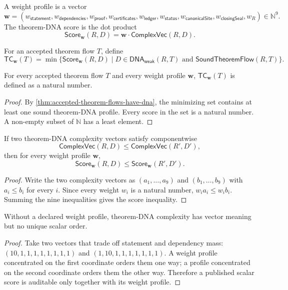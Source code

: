 \begin{definition}
\label{def:theorem-dna-weight-score}
A weight profile is a vector
$$
\mathbf w=
(w_{\mathsf{statement}},w_{\mathsf{dependencies}},w_{\mathsf{proof}},
w_{\mathsf{certificates}},w_{\mathsf{ledger}},w_{\mathsf{status}},
w_{\mathsf{canonicalSite}},w_{\mathsf{closingSeal}},w_R)
\in\mathbb N^{9}.
$$
The theorem-DNA score is the dot product
$$
\mathsf{Score}_{\mathbf w}(R,D)=
\mathbf w\cdot\mathsf{ComplexVec}(R,D).
$$
\end{definition}

\begin{definition}
\label{def:accepted-theorem-dna-complexity}
For an accepted theorem flow $T$, define
$$
\mathsf{TC}_{\mathbf w}(T)=
\min\{
\mathsf{Score}_{\mathbf w}(R,D)
\mid
D\in\mathsf{DNA}_{\mathsf{weak}}(R,T)
\text{ and }
\mathsf{SoundTheoremFlow}(R,T)
\}.
$$
\end{definition}

\begin{theorem}
\label{thm:accepted-theorem-complexity-defined}
For every accepted theorem flow $T$ and every weight profile $\mathbf w$,
$\mathsf{TC}_{\mathbf w}(T)$ is defined as a natural number.
\end{theorem}
\begin{proof}
By \autoref{thm:accepted-theorem-flows-have-dna}, the minimizing set contains
at least one sound theorem-DNA profile. Every score in the set is a natural
number. A non-empty subset of $\mathbb N$ has a least element.
\end{proof}

\begin{theorem}
\label{thm:theorem-dna-score-monotonicity}
If two theorem-DNA complexity vectors satisfy componentwise
$$
\mathsf{ComplexVec}(R,D)\leq\mathsf{ComplexVec}(R',D'),
$$
then for every weight profile $\mathbf w$,
$$
\mathsf{Score}_{\mathbf w}(R,D)
\leq
\mathsf{Score}_{\mathbf w}(R',D').
$$
\end{theorem}
\begin{proof}
Write the two complexity vectors as $(a_1,\ldots,a_9)$ and
$(b_1,\ldots,b_9)$ with $a_i\leq b_i$ for every $i$. Since every weight
$w_i$ is a natural number, $w_i a_i\leq w_i b_i$. Summing the nine
inequalities gives the score inequality.
\end{proof}

\begin{theorem}
\label{thm:scalar-complexity-requires-weight-profile}
Without a declared weight profile, theorem-DNA complexity has vector meaning
but no unique scalar order.
\end{theorem}
\begin{proof}
Take two vectors that trade off statement and dependency mass:
$(10,1,1,1,1,1,1,1,1)$ and $(1,10,1,1,1,1,1,1,1)$. A weight profile
concentrated on the first coordinate orders them one way; a profile
concentrated on the second coordinate orders them the other way. Therefore a
published scalar score is auditable only together with its weight profile.
\end{proof}

